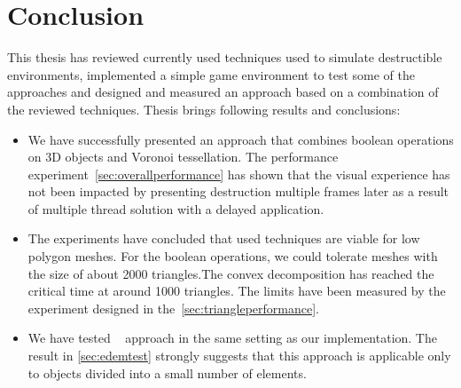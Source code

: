 \chapter*{Conclusion}

This thesis has reviewed currently used techniques used to simulate destructible environments, implemented a simple game environment to test some of the approaches and designed and measured an approach based on a combination of the reviewed techniques. Thesis brings following results and conclusions:

\begin{itemize}
\item We have successfully presented an approach that combines boolean operations on 3D objects and Voronoi tessellation. The performance experiment~\cref{sec:overallperformance} has shown that the visual experience has not been impacted by presenting destruction multiple frames later as a result of multiple thread solution with a delayed application.

\item The experiments have concluded that used techniques are viable for low polygon meshes. For the boolean operations, we could tolerate meshes with the size of about 2000 triangles.The convex decomposition has reached the critical time at around 1000 triangles. The limits have been measured by the experiment designed in the~\cref{sec:triangleperformance}.

\item We have tested ~\citet{edem} approach in the same setting as our implementation. The result in \cref{sec:edemtest} strongly suggests that this approach is applicable only to objects divided into a small number of elements.
\end{itemize}


